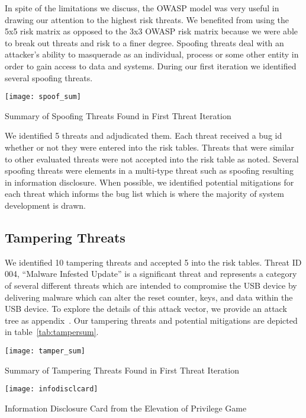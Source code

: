 In spite of the limitations we discuss, the OWASP model was very useful in
drawing our attention to the highest risk threats.  We benefited from using the
5x5 risk matrix as opposed to the 3x3 OWASP risk matrix because we were able to
break out threats and risk to a finer degree. Spoofing threats deal with an
attacker's ability to masquerade as an individual, process or some other entity
in order to gain access to data and systems.  During our first iteration we
identified several spoofing threats.

\begin{table*}[ht]
    \centering
    \texttt{[image: spoof\_sum]}
    \caption{Summary of Spoofing Threats Found in First Threat Iteration}
    \label{tab:spoofsum}
\end{table*}
We identified 5 threats and adjudicated them. Each threat received a bug id
whether or not they were entered into the risk tables.  Threats that were
similar to other evaluated threats were not accepted into the risk table as
noted. Several spoofing threats were elements in a multi-type threat such as
spoofing resulting in information disclosure. When possible, we identified
potential mitigations for each threat which informs the bug list which is where
the majority of system development is drawn.

\subsection{Tampering Threats}

We identified 10 tampering threats and accepted 5 into the risk tables. Threat ID 004,
``Malware Infested Update'' is a significant threat and represents a category of
several different threats which are intended to compromise the USB device by
delivering malware which can alter the reset counter, keys, and data within the
USB device. To explore the details of this attack vector, we provide
an attack tree as appendix~.  Our tampering threats and
potential mitigations are depicted in
table~\ref{tab:tampersum}.

\begin{table*}[]
    \centering
    \texttt{[image: tamper\_sum]}
    \caption{Summary of Tampering Threats Found in First Threat Iteration}
    \label{tab:tampersum}
\end{table*}

\begin{marginfigure}[0.25in]%
\centering
  \texttt{[image: infodisclcard]}
  \caption{Information Disclosure Card from the Elevation of Privilege Game}
  \label{fig:spoofcard}
\end{marginfigure}

